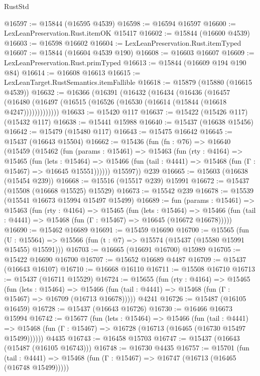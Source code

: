 \begin{lexlean}{RustStd}
\begin{coremodule}
@16597 := @15844 (@16595 @4539)
@16598 := @16594 @16597
@16600 := LexLeanPreservation.Rust.itemOK @15417
@16602 := @15844 (@16600 @4539)
@16603 := @16598 @16602
@16604 := LexLeanPreservation.Rust.itemTyped
@16607 := @15844 (@16604 @4539 @190)
@16608 := @16603 @16607
@16609 := LexLeanPreservation.Rust.primTyped
@16613 := @15844 (@16609 @194 @190 @84)
@16614 := @16608 @16613
@16615 := LexLeanTarget.RustSemantics.itemFallible
@16618 := @15879 (@15880 (@16615 @4539))
@16632 := @16366
    (@16391
      (@16432
        (@16434
          (@16436
            (@16457
              (@16480 (@16497 (@16515 (@16526 (@16530 (@16614 (@15844 (@16618 @4247)))))))))))))
@16633 := @15420 @117
@16637 := @15422 (@15426 @117) (@15432 @117)
@16638 := @15441 @15988
@16640 := @15437 (@16638 @15456)
@16642 := @15479 (@15480 @117)
@16643 := @15475 @16642
@16645 := @15437 (@16643 @15504)
@16662 := @15436
    (fun (fn : @76) =>
    @16640
      (@15459
        (@15462
          (fun (params : @15461) =>
          @15463
            (fun (rty : @4164) =>
            @15465
              (fun (lets : @15464) =>
              @15466 (fun (tail : @4441) => @15468 (fun (Γ : @15467) => @16645 @15551))))))
        @15597))
    @239
@16665 := @15603 (@16638 (@15454 @239))
@16668 := @15516 (@15517 @239) @15991
@16672 := @15437 (@15508 (@16668 @15525) @15529)
@16673 := @15542 @239
@16678 := @15539 (@15541 @16673 @15994 @15497 @15499)
@16689 := fun (params : @15461) =>
  @15463
    (fun (rty : @4164) =>
    @15465
      (fun (lets : @15464) =>
      @15466 (fun (tail : @4441) => @15468 (fun (Γ : @15467) => @16645 (@16672 @16678)))))
@16690 := @15462 @16689
@16691 := @15459 @16690
@16700 := @15565
    (fun (U : @15564) => @15566 (fun (t : @7) => @15574 (@15437 (@15580 @15991 @15455) @15591)))
@16703 := @16665 (@16691 @16700) @15989
@16705 := @15422 @16690 @16700
@16707 := @15652 @16689 @4487
@16709 := @15437 (@16643 @16107)
@16710 := @16668 @16110
@16711 := @15508 @16710
@16713 := @15437 (@16711 @15529)
@16724 := @15655
    (fun (rty : @4164) =>
    @15465
      (fun (lets : @15464) =>
      @15466 (fun (tail : @4441) => @15468 (fun (Γ : @15467) => @16709 (@16713 @16678)))))
    @4241
@16726 := @15487 (@16105 @16459)
@16728 := @15437 (@16643 @16726)
@16730 := @16466 @16673 @15994
@16742 := @15677
    (fun (lets : @15464) =>
    @15466
      (fun (tail : @4441) =>
      @15468 (fun (Γ : @15467) => @16728 (@16713 (@16465 (@16730 @15497 @15499))))))
    @4435
@16743 := @16458 @15703
@16747 := @15437 (@16643 (@15487 (@16105 @16743)))
@16748 := @16730 @4435
@16757 := @15701
    (fun (tail : @4441) => @15468 (fun (Γ : @15467) => @16747 (@16713 (@16465 (@16748 @15499)))))

\end{coremodule}
\end{lexlean}
